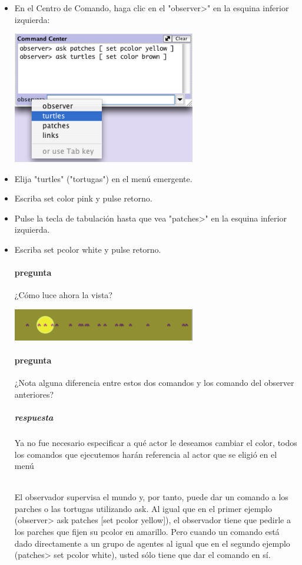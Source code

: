\documentclass[12pt,letterpaper]{article}
\begin{document}
\begin{itemize}
\item En el Centro de Comando, haga clic en el "observer>" en la esquina inferior izquierda:

\begin{center}
	\includegraphics[width=8cm]{./imagenes/image5.png}
\end{center}


\item Elija "turtles" ("tortugas") en el menú emergente.
\item Escriba set color pink  y pulse retorno.
\item Pulse la tecla de tabulación hasta que vea "patches>" en la esquina inferior izquierda.
\item Escriba set pcolor white y pulse retorno.

\paragraph{pregunta}¿Cómo luce ahora la vista?

\begin{center}
	\includegraphics[width=8cm]{./imagenes/image6.png}
\end{center}

\paragraph{pregunta}¿Nota alguna diferencia entre estos dos comandos y los comando del observer anteriores?

\subparagraph{respuesta}Ya  no fue necesario especificar a qué actor le deseamos cambiar el color, todos los comandos que ejecutemos harán referencia al actor que se eligió en el menú

\hfill \\
El observador supervisa el mundo y, por tanto, puede dar un comando a los parches o las tortugas utilizando ask.  Al igual que en el primer ejemplo (observer> ask patches [set pcolor yellow]), el observador tiene que pedirle a los parches que fijen su pcolor en amarillo. Pero cuando un comando está dado directamente a un grupo de agentes al igual que en el segundo ejemplo (patches> set pcolor white), usted sólo tiene que dar el comando en sí.


\end{itemize}
\end{document}
